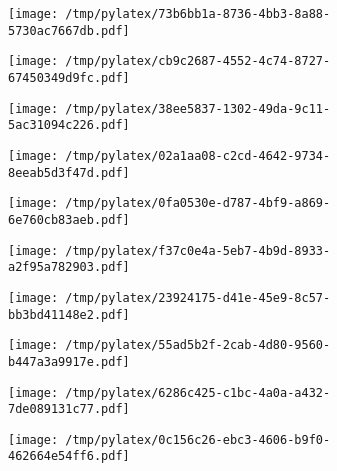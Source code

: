 \documentclass{article}
\begin{document}
\begin{figure}[htbp]
\begin{subfigure}[b]{.3\linewidth}
\texttt{[image: /tmp/pylatex/73b6bb1a-8736-4bb3-8a88-5730ac7667db.pdf]}
\end{subfigure}
\begin{subfigure}[b]{.3\linewidth}
\texttt{[image: /tmp/pylatex/cb9c2687-4552-4c74-8727-67450349d9fc.pdf]}
\end{subfigure}
\begin{subfigure}[b]{.3\linewidth}
\texttt{[image: /tmp/pylatex/38ee5837-1302-49da-9c11-5ac31094c226.pdf]}
\end{subfigure}
\begin{subfigure}[b]{.3\linewidth}
\texttt{[image: /tmp/pylatex/02a1aa08-c2cd-4642-9734-8eeab5d3f47d.pdf]}
\end{subfigure}
\begin{subfigure}[b]{.3\linewidth}
\texttt{[image: /tmp/pylatex/0fa0530e-d787-4bf9-a869-6e760cb83aeb.pdf]}
\end{subfigure}
\begin{subfigure}[b]{.3\linewidth}
\texttt{[image: /tmp/pylatex/f37c0e4a-5eb7-4b9d-8933-a2f95a782903.pdf]}
\end{subfigure}
\begin{subfigure}[b]{.3\linewidth}
\texttt{[image: /tmp/pylatex/23924175-d41e-45e9-8c57-bb3bd41148e2.pdf]}
\end{subfigure}
\begin{subfigure}[b]{.3\linewidth}
\texttt{[image: /tmp/pylatex/55ad5b2f-2cab-4d80-9560-b447a3a9917e.pdf]}
\end{subfigure}
\begin{subfigure}[b]{.3\linewidth}
\texttt{[image: /tmp/pylatex/6286c425-c1bc-4a0a-a432-7de089131c77.pdf]}
\end{subfigure}
\begin{subfigure}[b]{.3\linewidth}
\texttt{[image: /tmp/pylatex/0c156c26-ebc3-4606-b9f0-462664e54ff6.pdf]}
\end{subfigure}
\end{figure}
\end{document}
